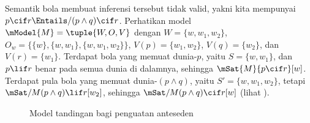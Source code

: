 \documentclass[../../../include/open-logic-section]{subfiles}
\begin{document}
\begin{ex}
  Semantik bola membuat inferensi tersebut tidak valid, yakni kita mempunyai
  $p \cif r \Entails/ (p \land q) \cif r$. Perhatikan model $\mModel{M}
  = \tuple{W, O, V}$ dengan $W = \{w, w_1, w_2\}$, $O_w = \{\{w\}, \{w,
  w_1\}, \{w, w_1, w_2\}\}$, $V(p) = \{w_1, w_2\}$, $V(q) = \{w_2\}$,
  dan $V(r) = \{w_1\}$. Terdapat bola yang memuat dunia-$p$, yaitu $S =
  \{w, w_1\}$, dan $p \lif r$ benar pada semua dunia di dalamnya, sehingga
  $\mSat{M}{p \cif r}[w]$. Terdapat pula bola yang memuat dunia-$(p \land q)$,
  yaitu $S' = \{w, w_1, w_2\}$, tetapi $\mSat/{M}{(p \land q) \lif r}[w_2]$,
  sehingga $\mSat/{M}{(p \land q) \cif r}[w]$ (lihat
  ).

\begin{figure}
\begin{center}
\caption{Model tandingan bagi penguatan anteseden}
\end{center}
\end{figure}
\end{ex}
\end{document}
